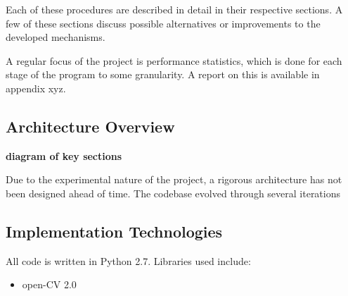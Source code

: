 Each of these procedures are described in detail in their respective sections.
A few of these sections discuss possible alternatives or improvements to the
developed mechanisms.

A regular focus of the project is performance statistics, which is done for each
stage of the program to some granularity.
A report on this is available in appendix xyz.

\subsection{Architecture Overview}
\textbf{diagram of key sections}

Due to the experimental nature of the project, a rigorous architecture has not
been designed ahead of time.
The codebase evolved through several iterations 


\subsection{Implementation Technologies}
All code is written in Python 2.7.
Libraries used include:
\begin{itemize}
  \item open-CV 2.0
\end{itemize}
